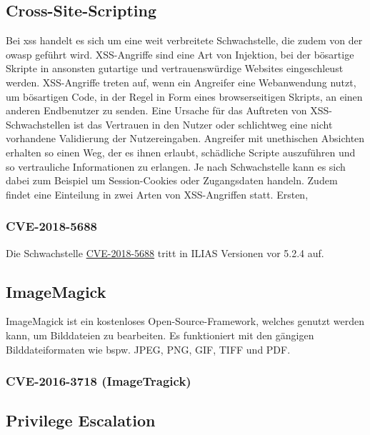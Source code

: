 \documentclass[10pt, a4paper,onecolumn ,titlepage]{article}
\begin{document}
    \subsection{Cross-Site-Scripting}
    \label{subsec:CrossSiteScripting}
    Bei \ac{xss} handelt es sich um eine weit verbreitete Schwachstelle, die zudem von der \ac{owasp} geführt wird.
    XSS-Angriffe sind eine Art von Injektion, bei der bösartige Skripte in ansonsten gutartige und vertrauenswürdige Websites eingeschleust werden.
    XSS-Angriffe treten auf, wenn ein Angreifer eine Webanwendung nutzt, um bösartigen Code, in der Regel in Form eines browserseitigen Skripts, an einen anderen Endbenutzer zu senden.\autocite{RN1}
    Eine Ursache für das Auftreten von XSS-Schwachstellen ist das Vertrauen in den Nutzer oder schlichtweg eine nicht vorhandene Validierung der Nutzereingaben.
    Angreifer mit unethischen Absichten erhalten so einen Weg, der es ihnen erlaubt, schädliche Scripte auszuführen und so vertrauliche Informationen zu erlangen.
    Je nach Schwachstelle kann es sich dabei zum Beispiel um Session-Cookies oder Zugangsdaten handeln.
    Zudem findet eine Einteilung in zwei Arten von XSS-Angriffen statt. Ersten,

    \subsubsection{CVE-2018-5688}
    \label{subsubsec:CVE-2018-5688}
    Die Schwachstelle \href{https://www.cve.org/CVERecord?id=CVE-2018-5688}{CVE-2018-5688} tritt in ILIAS Versionen vor 5.2.4 auf.

    \subsection{ImageMagick}
    \label{subsec:ImageMagick}
    ImageMagick ist ein kostenloses Open-Source-Framework, welches genutzt werden kann, um Bilddateien zu bearbeiten.
    Es funktioniert mit den gängigen Bilddateiformaten wie bspw. JPEG, PNG, GIF, TIFF und PDF. \autocite{imagemagick}

    \subsubsection{CVE-2016-3718 (ImageTragick)}
    \label{subsubsec:CVE-2016-3718}

    \subsection{Privilege Escalation}
    \label{subsec:PrivilegeEscalation}
\end{document}
